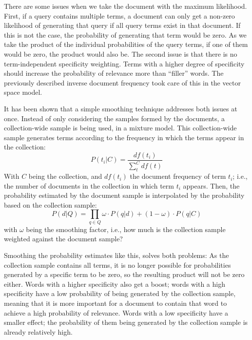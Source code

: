 There are some issues when we take the document with the maximum likelihood. First, if a query contains multiple terms, a document can only get a non-zero likelihood of generating that query if all query terms exist in that document. If this is not the case, the probability of generating that term would be zero. As we take the product of the individual probabilities of the query terms, if one of them would be zero, the product would also be. The second issue is that there is no term-independent specificity weighting. Terms with a higher degree of specificity should increase the probability of relevance more than ``filler'' words. The previously described inverse document frequency took care of this in the vector space model.

It has been shown that a simple smoothing technique addresses both issues at once. Instead of only considering the samples formed by the documents, a collection-wide sample is being used, in a mixture model. This collection-wide sample generates terms according to the frequency in which the terms appear in the collection:
\begin{equation}
	P(t_i|C) = \frac{\mathit{df}(t_i)}{\sum_t^C \mathit{df}(t)}
\end{equation}
With $C$ being the collection, and $df(t_i)$ the document frequency of term $t_i$; i.e., the number of documents in the collection in which term $t_i$ appears. Then, the probability estimated by the document sample is interpolated by the probability based on the collection sample:
\begin{equation}
	P(d|Q) = \prod_{q \in Q} \omega \cdot P(q | d) + (1 - \omega) \cdot P(q | C) 
\end{equation}
with $\omega$ being the smoothing factor, i.e., how much is the collection sample weighted against the document sample?

Smoothing the probability estimates like this, solves both problems: As the collection sample contains all terms, it is no longer possible for probabilities generated by a specific term to be zero, so the resulting product will not be zero either. Words with a higher specificity also get a boost; words with a high specificity have a low probability of being generated by the collection sample, meaning that it is more important for a document to contain that word to achieve a high probability of relevance. Words with a low specificity have a smaller effect; the probability of them being generated by the collection sample is already relatively high. 

